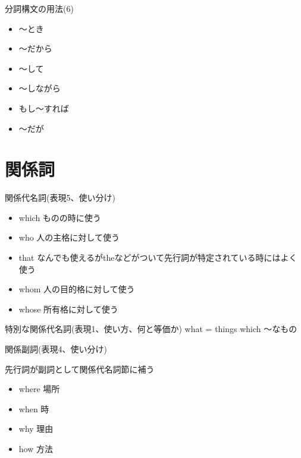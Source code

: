 \documentclass[10pt]{jsarticle}
\newcommand{\answer}[2]{{\color{orange}#2}}
\newcommand{\answer}[2]{\vspace{#1mm}}
\begin{document}
\begin{itembox}[l]{分詞構文の用法(6)}
	\answer{30}{
		\begin{itemize}
			\item 〜とき
			\item 〜だから
			\item 〜して
			\item 〜しながら
			\item もし〜すれば
			\item 〜だが
		\end{itemize}
	}
\end{itembox}

\newpage
\section{関係詞}

\begin{itembox}[l]{関係代名詞(表現5、使い分け)}
	\answer{20}{
		\begin{itemize}
			\item which  ものの時に使う
			\item who 人の主格に対して使う
			\item that なんでも使えるがtheなどがついて先行詞が特定されている時にはよく使う
			\item whom 人の目的格に対して使う
			\item whose 所有格に対して使う
		\end{itemize}
	}
\end{itembox}

\begin{itembox}[l]{特別な関係代名詞(表現1、使い方、何と等価か)}
	\answer{10}{
		what = things which 〜なもの
	}
\end{itembox}

\begin{itembox}[l]{関係副詞(表現4、使い分け)}
	\answer{17}{
		先行詞が副詞として関係代名詞節に補う
		\begin{multicols}{4}
			\begin{itemize}

				\item where 場所
				\item when 時
				\item why 理由
				\item how 方法
			\end{itemize}
		\end{multicols}
	}
\end{itembox}
\end{document}

